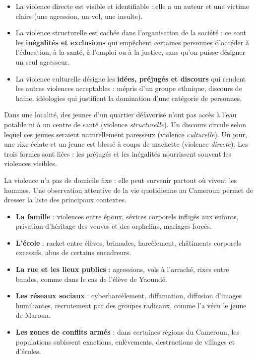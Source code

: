 \documentclass[11pt]{article}
\newcommand{\cle}[1]{{\popxbold\color{popdark}#1}}
\newcounter{popsec}
\newcounter{popsub}
\newcommand{\courssub}[1]{%
  \stepcounter{popsub}%
  \par\vspace{9pt}\noindent{\popxbold\fontsize{11.5}{13}\selectfont\color{popink}{\color{poporange}\thepopsec.\thepopsub}\hspace{6pt}#1}\par\nopagebreak\vspace{4pt}
}
\begin{document}
\begin{definition}
\begin{itemize}
\item La \cle{violence directe} est visible et identifiable : elle a un auteur et une victime clairs (une agression, un vol, une insulte).
\item La \cle{violence structurelle} est cachée dans l'organisation de la société : ce sont les \textbf{inégalités et exclusions} qui empêchent certaines personnes d'accéder à l'éducation, à la santé, à l'emploi ou à la justice, sans qu'on puisse désigner un seul agresseur.
\item La \cle{violence culturelle} désigne les \textbf{idées, préjugés et discours} qui rendent les autres violences \og acceptables \fg{} : mépris d'un groupe ethnique, discours de haine, idéologies qui justifient la domination d'une catégorie de personnes.
\end{itemize}
\end{definition}

\begin{exemplebox}
Dans une localité, des jeunes d'un quartier défavorisé n'ont pas accès à l'eau potable ni à un centre de santé (violence \emph{structurelle}). Un discours circule selon lequel ces jeunes seraient \og naturellement paresseux \fg{} (violence \emph{culturelle}). Un jour, une rixe éclate et un jeune est blessé à coups de machette (violence \emph{directe}). Les trois formes sont liées : les préjugés et les inégalités nourrissent souvent les violences visibles.
\end{exemplebox}

\courssub{Les lieux et contextes des violences}

La violence n'a pas de domicile fixe : elle peut survenir partout où vivent les hommes. Une observation attentive de la vie quotidienne au Cameroun permet de dresser la liste des principaux contextes.

\begin{itemize}
\item \textbf{La famille} : violences entre époux, sévices corporels infligés aux enfants, privation d'héritage des veuves et des orphelins, mariages forcés.
\item \textbf{L'école} : racket entre élèves, brimades, harcèlement, châtiments corporels excessifs, abus de certains encadreurs.
\item \textbf{La rue et les lieux publics} : agressions, vols à l'arraché, rixes entre bandes, comme dans le cas de l'élève de Yaoundé.
\item \textbf{Les réseaux sociaux} : cyberharcèlement, diffamation, diffusion d'images humiliantes, recrutement par des groupes radicaux, comme l'a vécu le jeune de Maroua.
\item \textbf{Les zones de conflits armés} : dans certaines régions du Cameroun, les populations subissent exactions, enlèvements, destructions de villages et d'écoles.
\end{itemize}
\end{document}
